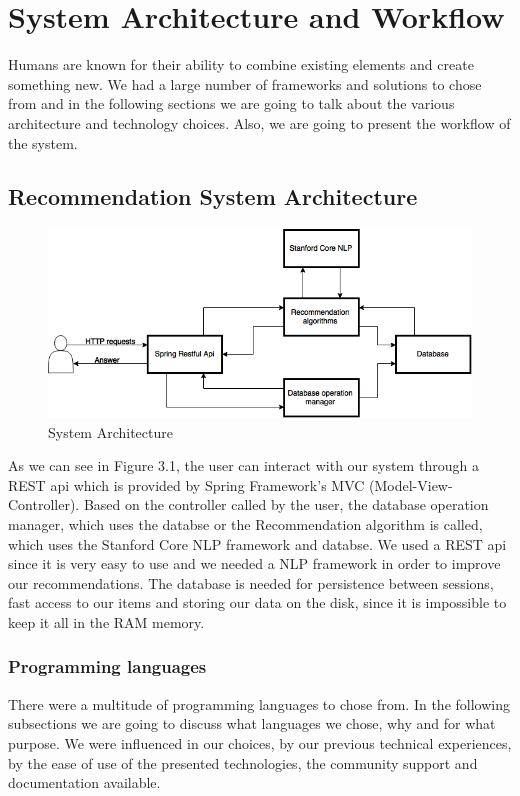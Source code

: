 \chapter{System Architecture and Workflow}
\label{chapter:system-architecture}
Humans are known for their ability to combine existing elements and create something new. We had a large number of frameworks and solutions to chose from and in the following sections we are going to talk about the various architecture and technology choices.
Also, we are going to present the workflow of the system.

\section{Recommendation System Architecture} 
\label{sec:architecture}

\begin{figure}[h]
\caption{System Architecture}
\includegraphics[width=1.0\textwidth]{src/img/architecture.png}
\end{figure}

As we can see in Figure 3.1, the user can interact with our system through a REST api which is provided by Spring Framework's MVC (Model-View-Controller). Based on the controller called by the user, the database operation manager, which uses the databse or the Recommendation algorithm is called, which uses the Stanford Core NLP framework and databse. We used a REST api since it is very easy to use and we needed a NLP framework in order to improve our recommendations. The database is needed for persistence between sessions, fast access to our items and storing our data on the disk, since it is impossible to keep it all in the RAM memory.

\subsection{Programming languages}
\label{sec:programming-languages}
There were a multitude of programming languages to chose from.
In the following subsections we are going to discuss what languages we chose, why and for what purpose.
We were influenced in our choices, by our previous technical experiences, by the ease of use of the presented technologies, the community support and documentation available.

